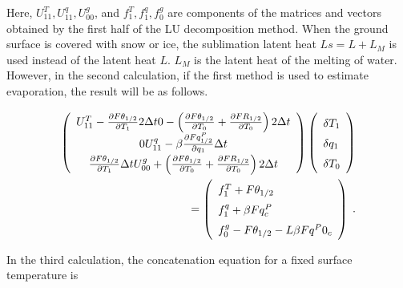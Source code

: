 Here, \(U_{11}^T, U_{11}^q, U_{00}^g\), and \(f_1^T, f_1^q, f_0^g\) are
components of the matrices and vectors obtained by the first half of the
LU decomposition method. When the ground surface is covered with snow or
ice, the sublimation latent heat \(Ls = L + L_M\) is used instead of the
latent heat \(L\). \(L_M\) is the latent heat of the melting of water.
However, in the second calculation, if the first method is used to
estimate evaporation, the result will be as follows.

\begin{eqnarray}
 \renewcommand{\arraystretch}{1.5}
  \left( \begin{array}{ccc}
      U_{11}^T - \frac{\partial{F\theta_{1/2}}}{\partial {T_1}} 2 \Delta t
      0
      - \left( \frac{\partial{F\theta_{1/2}}}{\partial {T_0}}
                         + \frac{\partial{FR_{1/2}}}{\partial {T_0}}\right) 2 \Delta t \\
      0
      U_{11}^q - \beta \frac{\partial{Fq^P_{1/2}}}{\partial {q_1}} \Delta t  \\
        \frac{\partial{F\theta_{1/2}}}{\partial {T_1}} \Delta t
      U_{00}^g + \left(\frac{\partial{F\theta_{1/2}}}{\partial {T_0}}
                + \frac{\partial{FR_{1/2}}}{\partial {T_0}} \right) 2 \Delta t \\
  \end{array} \right)
  \left( \begin{array}{l}
      \delta T_1 \\ \delta q_1 \\ \delta T_0 \\
  \end{array} \right)   \\
=
  \left( \begin{array}{l}
      f_1^T + F\theta_{1/2} \\
      f_1^q + \beta Fq^P_c \\
      f_0^g - F\theta_{1/2} - L \beta Fq^P0_c \\
  \end{array} \right) \; .
\end{eqnarray}

In the third calculation, the concatenation equation for a fixed surface
temperature is

